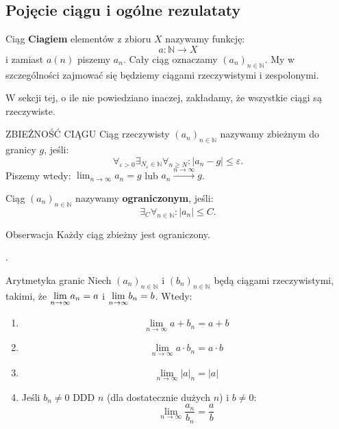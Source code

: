 \documentclass{article}
\numberwithin{defi}{section}
\numberwithin{defi}{section}
\newcommand{\N}{\mathbb{N}}
\newcommand{\oo}{\infty}
\providecommand{\eps}{\varepsilon}
\newcommand{\ciag}[1]{(#1_{n})_{n \in \N}}
\newcommand{\gras}[2]{\lim_{#1 \to \oo} #2_{#1}}
\newcommand{\lgras}[2]{\mathlarger{\lim}_{#1 \to \oo} #2_{#1}}
\begin{document}
\subsection{Pojęcie ciągu i ogólne rezulataty}
\begin{defr}{Ciąg}
    \textbf{Ciagiem} elementów z zbioru $X$ nazywamy funkcję:
    \begin{equation}
        a: \N \to X
    \end{equation}
    i zamiast $a(n)$ piszemy $a_n$. Cały ciąg oznaczamy $(a_n)_{n \in \N}$. My w szczególności zajmować się będziemy ciągami rzeczywistymi i zespolonymi.
\end{defr}
W sekcji tej, o ile nie powiedziano inaczej, zakładamy, że wszystkie ciągi są rzeczywiste.
\begin{defr}{ZBIEŻNOŚĆ CIĄGU}
    Ciąg rzeczywisty $\ciag{a}$ nazywamy zbieżnym do granicy $g$, jeśli:
    \begin{equation}
        \forall_{\eps > 0} \exists_{N_{\eps} \in \N} \forall_{n \geqslant N}: |a_n - g| \leqslant \eps.
    \end{equation}
    Piszemy wtedy: $\lim_{n \to \oo} a_n = g$ lub $a_n \xrightarrow{n \to \oo} g$.
\end{defr}

Ciąg $\ciag{a}$ nazywamy \textbf{ograniczonym}, jeśli:
\begin{equation}
    \exists_{C} \forall_{n \in \N}: |a_n| \leqslant C.
\end{equation}

\begin{obs}{Obserwacja}
    Każdy ciąg zbieżny jest ograniczony.
\end{obs}.

\begin{twier}{Arytmetyka granic}
    Niech $\ciag{a}$ i $\ciag{b}$ będą ciągami rzeczywistymi, takimi, że $\lgras{n}{a} = a$ i $\lgras{n}{b} = b$. Wtedy:
    \begin{enumerate}
        \item \begin{equation}
                  \gras{n}{a + b} = a + b
              \end{equation}
        \item \begin{equation}
                  \gras{n}{a \cdot b} = a \cdot b
              \end{equation}
        \item \begin{equation}
                  \gras{n}{|a|} = |a|
              \end{equation}
        \item Jeśli $b_n \neq 0$ DDD $n$ (dla dostatecznie dużych $n$) i $b \neq 0$:
              \begin{equation}
                  \lim_{n \to \oo} \frac{a_n}{b_n} = \frac{a}{b}
              \end{equation}

    \end{enumerate}
\end{twier}
\end{document}
